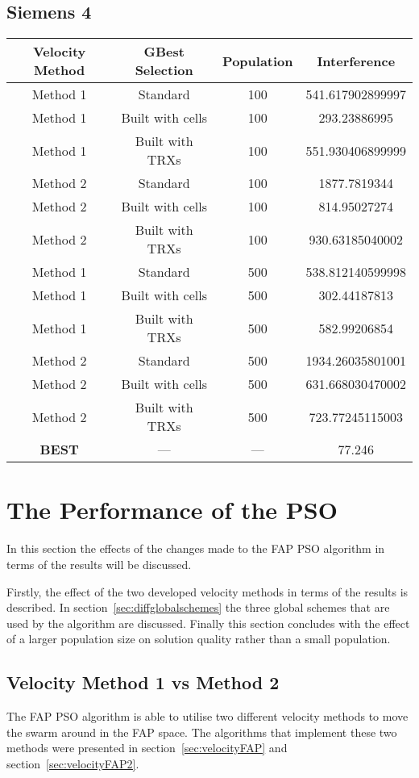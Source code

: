 \subsection{Siemens 4}
\begin{center}
	\begin{tabular}{| c | c | c | c |}
	\hline
	Velocity Method & GBest Selection & Population & Interference\\ \hline
	Method 1 & Standard & 100 & 541.617902899997\\ \hline
	Method 1 & Built with cells & 100 & 293.23886995\\ \hline
	Method 1 & Built with TRXs & 100 & 551.930406899999\\ \hline
	Method 2 & Standard & 100 & 1877.7819344\\ \hline
	Method 2 & Built with cells & 100 & 814.95027274\\ \hline
	Method 2 & Built with TRXs & 100 & 930.63185040002\\ \hline
	Method 1 & Standard & 500 & 538.812140599998\\ \hline
	Method 1 & Built with cells & 500 & 302.44187813\\ \hline
	Method 1 & Built with TRXs & 500 & 582.99206854\\ \hline
	Method 2 & Standard & 500 & 1934.26035801001\\ \hline
	Method 2 & Built with cells & 500 & 631.668030470002\\ \hline
	Method 2 & Built with TRXs & 500 & 723.77245115003\\ \hline
	\textbf{BEST} & --- & --- & 77.246\\ \hline
	\end{tabular}
\end{center}
\section{The Performance of the PSO}
In this section the effects of the changes made to the FAP PSO algorithm in terms of the results will be discussed. 

Firstly, the effect of the two developed velocity methods in terms of the results is described. In section~\ref{sec:diffglobalschemes} the three global schemes that are used by the algorithm are discussed. Finally this section concludes with the effect of a larger population size on solution quality rather than a small population.
\subsection{Velocity Method 1 vs Method 2}
The FAP PSO algorithm is able to utilise two different velocity methods to move the swarm around in the FAP space. The algorithms that implement these two methods were presented in section~\ref{sec:velocityFAP} and section~\ref{sec:velocityFAP2}.

